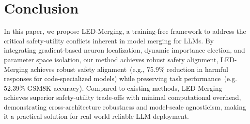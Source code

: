 





\section{Conclusion}
In this paper, we propose LED-Merging, a training-free framework to address the critical safety-utility conflicts inherent in model merging for LLMs. 
By integrating gradient-based neuron localization, dynamic importance election, and parameter space isolation, our method achieves robust safety alignment, LED-Merging achieves robust safety alignment~(e.g., 75.9\% reduction in harmful responses for code-specialized models) while preserving task performance~(e.g. 52.39\% GSM8K accuracy). Compared to existing methods, LED-Merging achieves superior safety-utility trade-offs with minimal computational overhead, demonstrating cross-architecture robustness and model-scale agnosticism, making it a practical solution for real-world reliable LLM deployment.

